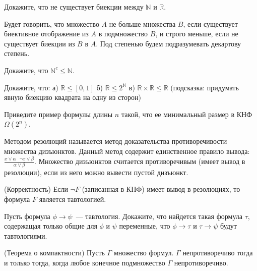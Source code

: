 \setcounter{curtask}{1}


\begin{task}
    Докажите, что не существует биекции между $\mathbb{N}$ и $\mathbb{R}$.
\end{task}

Будет говорить, что множество $A$ не больше множества $B$, если
существует биективное отображение из $A$ в подмножество $B$, и строго
меньше, если не существует биекции из $B$ в $A$. Под степенью будем
подразумевать декартову степень.

\begin{task}
    Докажите, что $\mathbb{N}^c \le \mathbb{N}$.
\end{task}

\begin{task}
    Докажите, что:
    а) $\mathbb{R} \le [0, 1]$
    б) $\mathbb{R} \le 2^{\mathbb{N}}$
    в) $\mathbb{R} \times \mathbb{R} \le \mathbb{R}$ (подсказка:
	    придумать явную биекцию квадрата на одну из сторон)
\end{task}

\begin{task}
    Приведите пример формулы длины $n$ такой, что ее минимальный
    размер в КНФ $\Omega(2^n)$.
\end{task}

\vspace{0.5cm}
Методом резолюций называется метод доказательства противоречивости множества
дизъюнктов. Данный метод содержит единственное правило вывода: $\frac{x \vee \alpha \
\ \ \neg x \vee \beta}{\alpha \vee \beta}$. Множество дизъюнктов считается
противоречивым (имеет вывод в резолюции), если из него можно вывести пустой дизъюнкт.

\begin{task} (Корректность)
    Если $\neg F$ (записанная в КНФ) имеет вывод в резолюциях, то
    формула $F$ является тавтологией.
\end{task}

\begin{task}
    Пусть формула $\phi \rightarrow \psi$~--- тавтология. Докажите,
    что найдется такая формула $\tau$, содержащая только общие для
    $\phi$ и $\psi$ переменные, что $\phi \rightarrow \tau$ и
    $\tau \rightarrow \psi$ будут тавтологиями.
\end{task}

\begin{task} (Теорема о компактности)
    Пусть $\Gamma$ множество формул. $\Gamma$ непротиворечиво тогда и
    только тогда, когда любое конечное подмножество $\Gamma$ непротиворечиво.
\end{task}
